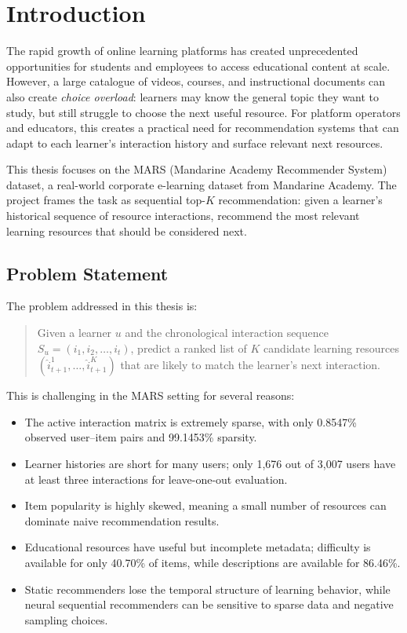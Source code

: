 
\section{Introduction}

The rapid growth of online learning platforms has created unprecedented opportunities for students and employees to access educational content at scale. However, a large catalogue of videos, courses, and instructional documents can also create \textit{choice overload}: learners may know the general topic they want to study, but still struggle to choose the next useful resource. For platform operators and educators, this creates a practical need for recommendation systems that can adapt to each learner's interaction history and surface relevant next resources.

This thesis focuses on the MARS (Mandarine Academy Recommender System) dataset, a real-world corporate e-learning dataset from Mandarine Academy. The project frames the task as sequential top-$K$ recommendation: given a learner's historical sequence of resource interactions, recommend the most relevant learning resources that should be considered next.

\subsection{Problem Statement}

The problem addressed in this thesis is:

\begin{quote}
Given a learner $u$ and the chronological interaction sequence $S_u = (i_1, i_2, \ldots, i_t)$, predict a ranked list of $K$ candidate learning resources $(\hat{i}_{t+1}^{1}, \ldots, \hat{i}_{t+1}^{K})$ that are likely to match the learner's next interaction.
\end{quote}

This is challenging in the MARS setting for several reasons:

\begin{itemize}
    \item The active interaction matrix is extremely sparse, with only 0.8547\% observed user--item pairs and 99.1453\% sparsity.
    \item Learner histories are short for many users; only 1,676 out of 3,007 users have at least three interactions for leave-one-out evaluation.
    \item Item popularity is highly skewed, meaning a small number of resources can dominate naive recommendation results.
    \item Educational resources have useful but incomplete metadata; difficulty is available for only 40.70\% of items, while descriptions are available for 86.46\%.
    \item Static recommenders lose the temporal structure of learning behavior, while neural sequential recommenders can be sensitive to sparse data and negative sampling choices.
\end{itemize}

